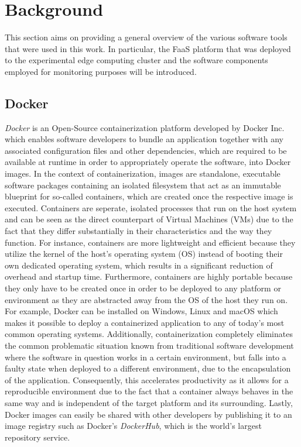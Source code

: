 \chapter{Background}\label{chapter:background}

This section aims on providing a general overview of the various software tools that were used in this work. In particular, the FaaS platform that was deployed to the experimental edge computing cluster and the software components employed for monitoring purposes will be introduced.

\section{Docker}
\textit{Docker} is an Open-Source containerization platform developed by Docker Inc. which enables software developers to bundle an application together with any associated configuration files and other dependencies, which are required to be available at runtime in order to appropriately operate the software, into Docker images. In the context of containerization, images are standalone, executable software packages containing an isolated filesystem that act as an immutable blueprint for so-called containers, which are created once the respective image is executed. Containers are seperate, isolated processes that run on the host system and can be seen as the direct counterpart of Virtual Machines (VMs) due to the fact that they differ substantially in their characteristics and the way they function. For instance, containers are more lightweight and efficient because they utilize the kernel of the host's operating system (OS) instead of booting their own dedicated operating system, which results in a significant reduction of overhead and startup time. Furthermore, containers are highly portable because they only have to be created once in order to be deployed to any platform or environment as they are abstracted away from the OS of the host they run on. For example, Docker can be installed on Windows, Linux and macOS which makes it possible to deploy a containerized application to any of today's most common operating systems. Additionally, containerization completely eliminates the common problematic situation known from traditional software development where the software in question works in a certain environment, but falls into a faulty state when deployed to a different environment, due to the encapsulation of the application. Consequently, this accelerates productivity as it allows for a reproducible environment due to the fact that a container always behaves in the same way and is independent of the target platform and its surrounding. Lastly, Docker images can easily be shared with other developers by publishing it to an image registry such as Docker's \textit{DockerHub}, which is the world's largest repository service. 

